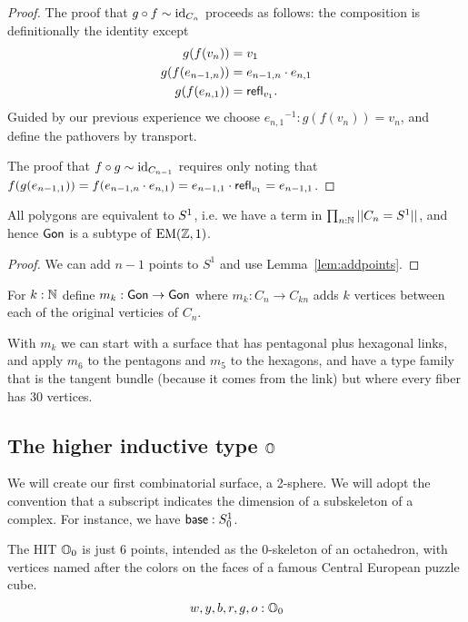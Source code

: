 \begin{proof}
The proof that \( g\circ f\sim\text{id}_{C_n} \) proceeds as follows: the composition is definitionally the identity except 
\begin{align*}
g(f(v_n))&=v_1\\
g(f(e_{n-1,n}))&=e_{n-1,n}\cdot e_{n,1}\\
g(f(e_{n,1}))&= \mathsf{refl}_{v_1}.
\end{align*}
Guided by our previous experience we choose \( {e_{n,1}}^{-1}:g(f(v_n))=v_n \), and define the pathovers by transport.

The proof that \( f\circ g\sim\text{id}_{C_{n-1}} \) requires only noting that \( f(g(e_{n-1,1}))=f(e_{n-1,n}\cdot e_{n,1})=e_{n-1,1}\cdot\mathsf{refl}_{v_1}=e_{n-1,1} \).
\end{proof}

\begin{mycor}
All polygons are equivalent to \( S^1 \), i.e. we have a term in \( \prod_{n:\mathbb{N}}||C_n=S^1|| \), and hence \( \mathsf{Gon} \) is a subtype of \( \mathrm{EM}(\mathbb{Z},1) \).
\end{mycor}
\begin{proof}
We can add \( n-1 \) points to \( S^1 \) and use Lemma~\ref{lem:addpoints}.
\end{proof}

\begin{mydef}
For \( k:\mathbb{N} \) define \( m_k:\mathsf{Gon}\to\mathsf{Gon} \) where \( m_k:C_n\to C_{kn} \) adds \( k \) vertices between each of the original verticies of \( C_n \).
\end{mydef}

With \( m_k \) we can start with a surface that has pentagonal plus hexagonal links, and apply \( m_6 \) to the pentagons and \( m_5 \) to the hexagons, and have a type family that is the tangent bundle (because it comes from the link) but where every fiber has 30 vertices.

\subsection{\texorpdfstring{The higher inductive type \( \mathbb{O} \)}{The higher inductive type O}}

We will create our first combinatorial surface, a 2-sphere. We will adopt the convention that a subscript indicates the dimension of a subskeleton of a complex. For instance, we have \( \mathsf{base}:S^1_0 \).

\begin{mydef}
The HIT \( \mathbb{O}_0 \) is just 6 points, intended as the 0-skeleton of an octahedron, with vertices named after the colors on the faces of a famous Central European puzzle cube.
\[ w, y, b, r, g, o : \mathbb{O}_0 \]
\end{mydef}

